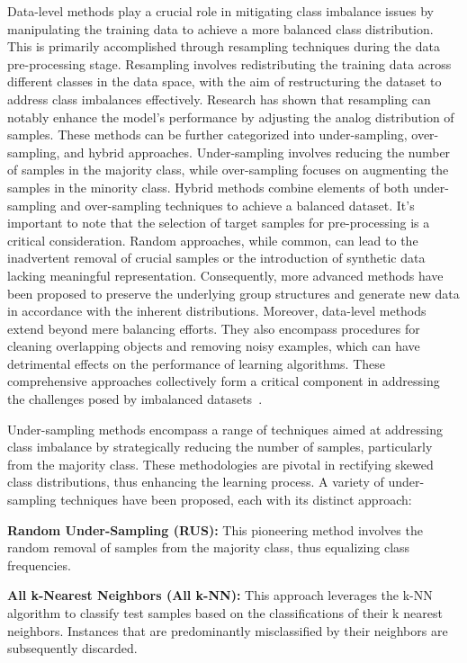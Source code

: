 Data-level methods play a crucial role in mitigating class imbalance issues by manipulating the training data to achieve a more balanced class distribution. This is primarily accomplished through resampling techniques during the data pre-processing stage. Resampling involves redistributing the training data across different classes in the data space, with the aim of restructuring the dataset to address class imbalances effectively. Research has shown that resampling can notably enhance the model's performance by adjusting the analog distribution of samples. 
These methods can be further categorized into under-sampling, over-sampling, and hybrid approaches. Under-sampling involves reducing the number of samples in the majority class, while over-sampling focuses on augmenting the samples in the minority class. Hybrid methods combine elements of both under-sampling and over-sampling techniques to achieve a balanced dataset. It's important to note that the selection of target samples for pre-processing is a critical consideration. Random approaches, while common, can lead to the inadvertent removal of crucial samples or the introduction of synthetic data lacking meaningful representation. Consequently, more advanced methods have been proposed to preserve the underlying group structures and generate new data in accordance with the inherent distributions.
Moreover, data-level methods extend beyond mere balancing efforts. They also encompass procedures for cleaning overlapping objects and removing noisy examples, which can have detrimental effects on the performance of learning algorithms. These comprehensive approaches collectively form a critical component in addressing the challenges posed by imbalanced datasets~\cite{Krawczyk2016,Fotouhi2019,Khushi2021}. 

Under-sampling methods encompass a range of techniques aimed at addressing class imbalance by strategically reducing the number of samples, particularly from the majority class. These methodologies are pivotal in rectifying skewed class distributions, thus enhancing the learning process. A variety of under-sampling techniques have been proposed, each with its distinct approach: 

\textbf{Random Under-Sampling (RUS):} This pioneering method involves the random removal of samples from the majority class, thus equalizing class frequencies. 

\textbf{All k-Nearest Neighbors (All k-NN):} This approach leverages the k-NN algorithm to classify test samples based on the classifications of their k nearest neighbors. Instances that are predominantly misclassified by their neighbors are subsequently discarded. 


